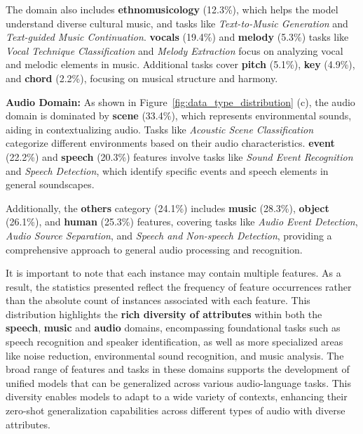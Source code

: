 The domain also includes \textbf{ethnomusicology} (12.3\%), which helps the model understand diverse cultural music, and tasks like \textit{Text-to-Music Generation} and \textit{Text-guided Music Continuation}. \textbf{vocals} (19.4\%) and \textbf{melody} (5.3\%) tasks like \textit{Vocal Technique Classification} and \textit{Melody Extraction} focus on analyzing vocal and melodic elements in music. Additional tasks cover \textbf{pitch} (5.1\%), \textbf{key} (4.9\%), and \textbf{chord} (2.2\%), focusing on musical structure and harmony.

\textbf{Audio Domain:}
As shown in Figure~\ref{fig:data_type_distribution} (c), the audio domain is dominated by \textbf{scene} (33.4\%), which represents environmental sounds, aiding in contextualizing audio. Tasks like \textit{Acoustic Scene Classification} categorize different environments based on their audio characteristics. \textbf{event} (22.2\%) and \textbf{speech} (20.3\%) features involve tasks like \textit{Sound Event Recognition} and \textit{Speech Detection}, which identify specific events and speech elements in general soundscapes.

Additionally, the \textbf{others} category (24.1\%) includes \textbf{music} (28.3\%), \textbf{object} (26.1\%), and \textbf{human} (25.3\%) features, covering tasks like \textit{Audio Event Detection}, \textit{Audio Source Separation}, and \textit{Speech and Non-speech Detection}, providing a comprehensive approach to general audio processing and recognition.


It is important to note that each instance may contain multiple features. As a result, the statistics presented reflect the frequency of feature occurrences rather than the absolute count of instances associated with each feature. 
This distribution highlights the \textbf{ rich diversity of attributes} within both the \textbf{speech}, \textbf{music} and \textbf{audio} domains, encompassing foundational tasks such as speech recognition and speaker identification, as well as more specialized areas like noise reduction, environmental sound recognition, and music analysis. The broad range of features and tasks in these domains supports the development of unified models that can be generalized across various audio-language tasks. This diversity enables models to adapt to a wide variety of contexts, enhancing their zero-shot generalization capabilities across different types of audio with diverse attributes.


